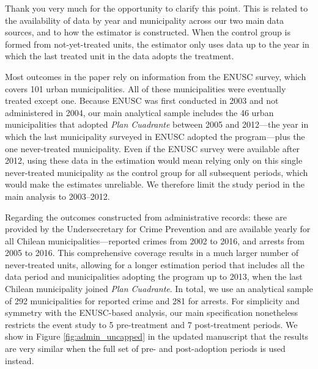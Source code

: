 


Thank you very much for the opportunity to clarify this point. This is related to the availability of data by year and municipality across our two main data sources, and to how the \citet{Callaway} estimator is constructed. When the control group is formed from not-yet-treated units, the estimator only uses data up to the year in which the last treated unit in the data adopts the treatment.

Most outcomes in the paper rely on information from the ENUSC survey, which covers 101 urban municipalities. All of these municipalities were eventually treated except one. Because ENUSC was first conducted in 2003 and not administered in 2004, our main analytical sample includes the 46 urban municipalities that adopted \emph{Plan Cuadrante} between 2005 and 2012---the year in which the last municipality surveyed in ENUSC adopted the program---plus the one never-treated municipality. Even if the ENUSC survey were available after 2012, using these data in the estimation would mean relying only on this single never-treated municipality as the control group for all subsequent periods, which would make the estimates unreliable. We therefore limit the study period in the main analysis to 2003--2012.


Regarding the outcomes constructed from administrative records: these are provided by the Undersecretary for Crime Prevention and are available yearly for all Chilean municipalities---reported crimes from 2002 to 2016, and arrests from 2005 to 2016. This comprehensive coverage results in a much larger number of never-treated units, allowing for a longer estimation period that includes all the data period and municipalities adopting the program up to 2013, when the last Chilean municipality joined \emph{Plan Cuadrante}. In total, we use an analytical sample of 292 municipalities for reported crime and 281 for arrests. For simplicity and symmetry with the ENUSC-based analysis, our main specification nonetheless restricts the event study to 5 pre-treatment and 7 post-treatment periods. We show in Figure \ref{fig:admin_uncapped} in the updated manuscript that the results are very similar when the full set of pre- and post-adoption periods is used instead.

